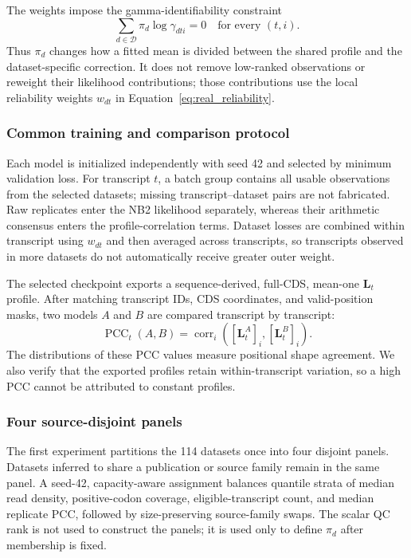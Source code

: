 The weights impose the gamma-identifiability constraint
\begin{equation}
    \sum_{d\in\mathcal D}\pi_d\log\gamma_{dti}=0
    \quad\text{for every }(t,i).
    \label{eq:real_gamma_centering}
\end{equation}
Thus $\pi_d$ changes how a fitted mean is divided between the shared profile and
the dataset-specific correction.  It does not remove low-ranked observations
or reweight their likelihood contributions; those contributions use the local
reliability weights $w_{dt}$ in Equation~\ref{eq:real_reliability}.

\subsubsection{Common training and comparison protocol}
\label{sec:real_stability_metrics}

Each model is initialized independently with seed 42 and selected by minimum
validation loss.  For transcript $t$, a batch group contains all usable
observations from the selected datasets; missing transcript--dataset pairs are
not fabricated.  Raw replicates enter the NB2 likelihood separately, whereas
their arithmetic consensus enters the profile-correlation terms.  Dataset
losses are combined within transcript using $w_{dt}$ and then averaged across
transcripts, so transcripts observed in more datasets do not automatically
receive greater outer weight.

The selected checkpoint exports a sequence-derived, full-CDS, mean-one
$\mathbf{L}_t$ profile.  After matching transcript IDs, CDS coordinates,
and valid-position masks, two models $A$ and $B$ are compared transcript by
transcript:
\begin{equation}
    \operatorname{PCC}_t(A,B)
    =\operatorname{corr}_{i}\!\left(
      [\mathbf{L}^{A}_t]_i,[\mathbf{L}^{B}_t]_i\right).
    \label{eq:real_profile_agreement}
\end{equation}
The distributions of these PCC values measure positional shape agreement.  We
also verify that the exported profiles retain within-transcript variation, so a
high PCC cannot be attributed to constant profiles.

\subsubsection{Four source-disjoint panels}
\label{sec:real_four_panel_design}

The first experiment partitions the 114 datasets once into four disjoint
panels.  Datasets inferred to share a publication or source family remain in
the same panel.  A seed-42, capacity-aware assignment balances quantile strata
of median read density, positive-codon coverage, eligible-transcript count, and
median replicate PCC, followed by size-preserving source-family swaps.  The
scalar QC rank is not used to construct the panels; it is used only to define
$\pi_d$ after membership is fixed.

